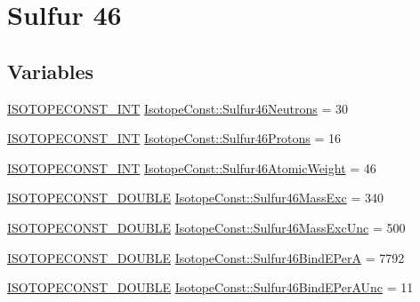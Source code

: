 \hypertarget{group___isotope_const-_sulfur-_s46}{}\section{Sulfur 46}
\label{group___isotope_const-_sulfur-_s46}
\subsection*{Variables}
\begin{DoxyCompactItemize}
\item 
\mbox{\hyperlink{group___isotope_const-_macros_ga5f18360b3e99483a35c32d789e62621c}{I\+S\+O\+T\+O\+P\+E\+C\+O\+N\+S\+T\+\_\+\+I\+NT}} \mbox{\hyperlink{group___isotope_const-_sulfur-_s46_ga7cee5ce55d27ad25a68752d885b70d63}{Isotope\+Const\+::\+Sulfur46\+Neutrons}} = 30
\item 
\mbox{\hyperlink{group___isotope_const-_macros_ga5f18360b3e99483a35c32d789e62621c}{I\+S\+O\+T\+O\+P\+E\+C\+O\+N\+S\+T\+\_\+\+I\+NT}} \mbox{\hyperlink{group___isotope_const-_sulfur-_s46_ga6cd9cf6980b8f206711b4a7e3462ef1d}{Isotope\+Const\+::\+Sulfur46\+Protons}} = 16
\item 
\mbox{\hyperlink{group___isotope_const-_macros_ga5f18360b3e99483a35c32d789e62621c}{I\+S\+O\+T\+O\+P\+E\+C\+O\+N\+S\+T\+\_\+\+I\+NT}} \mbox{\hyperlink{group___isotope_const-_sulfur-_s46_ga30fc029d3a81cbb272b1c1990659e835}{Isotope\+Const\+::\+Sulfur46\+Atomic\+Weight}} = 46
\item 
\mbox{\hyperlink{group___isotope_const-_macros_ga8f45a7272ce02c0b4c65c44636ed719a}{I\+S\+O\+T\+O\+P\+E\+C\+O\+N\+S\+T\+\_\+\+D\+O\+U\+B\+LE}} \mbox{\hyperlink{group___isotope_const-_sulfur-_s46_ga97965a547b455a19d5ecb45723174bd8}{Isotope\+Const\+::\+Sulfur46\+Mass\+Exc}} = 340
\item 
\mbox{\hyperlink{group___isotope_const-_macros_ga8f45a7272ce02c0b4c65c44636ed719a}{I\+S\+O\+T\+O\+P\+E\+C\+O\+N\+S\+T\+\_\+\+D\+O\+U\+B\+LE}} \mbox{\hyperlink{group___isotope_const-_sulfur-_s46_ga70f920d82b48183b8a5612e6304b9280}{Isotope\+Const\+::\+Sulfur46\+Mass\+Exc\+Unc}} = 500
\item 
\mbox{\hyperlink{group___isotope_const-_macros_ga8f45a7272ce02c0b4c65c44636ed719a}{I\+S\+O\+T\+O\+P\+E\+C\+O\+N\+S\+T\+\_\+\+D\+O\+U\+B\+LE}} \mbox{\hyperlink{group___isotope_const-_sulfur-_s46_ga3ad424fc4f9b0afffaf33ec4e340941f}{Isotope\+Const\+::\+Sulfur46\+Bind\+E\+PerA}} = 7792
\item 
\mbox{\hyperlink{group___isotope_const-_macros_ga8f45a7272ce02c0b4c65c44636ed719a}{I\+S\+O\+T\+O\+P\+E\+C\+O\+N\+S\+T\+\_\+\+D\+O\+U\+B\+LE}} \mbox{\hyperlink{group___isotope_const-_sulfur-_s46_ga6902ce983d4f919edf377e4e79bd86af}{Isotope\+Const\+::\+Sulfur46\+Bind\+E\+Per\+A\+Unc}} = 11

\end{DoxyCompactItemize}
